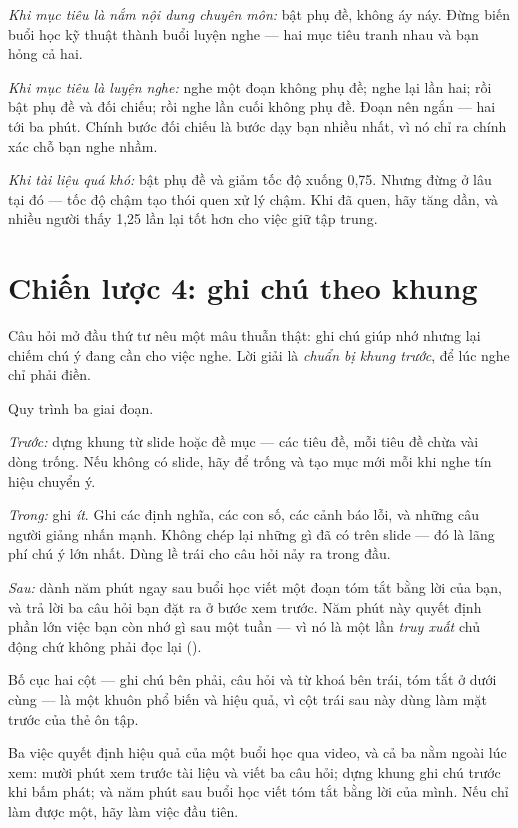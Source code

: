 \documentclass[../../english.tex]{subfiles}
\begin{document}
\emph{Khi mục tiêu là nắm nội dung chuyên môn:} bật phụ đề, không áy náy. Đừng biến buổi học kỹ thuật thành buổi luyện nghe --- hai mục tiêu tranh nhau và bạn hỏng cả hai.

\emph{Khi mục tiêu là luyện nghe:} nghe một đoạn không phụ đề; nghe lại lần hai; rồi bật phụ đề và đối chiếu; rồi nghe lần cuối không phụ đề. Đoạn nên ngắn --- hai tới ba phút. Chính bước đối chiếu là bước dạy bạn nhiều nhất, vì nó chỉ ra chính xác chỗ bạn nghe nhầm.

\emph{Khi tài liệu quá khó:} bật phụ đề và giảm tốc độ xuống 0,75. Nhưng đừng ở lâu tại đó --- tốc độ chậm tạo thói quen xử lý chậm. Khi đã quen, hãy tăng dần, và nhiều người thấy 1,25 lần lại tốt hơn cho việc giữ tập trung.

\section{Chiến lược 4: ghi chú theo khung}

Câu hỏi mở đầu thứ tư nêu một mâu thuẫn thật: ghi chú giúp nhớ nhưng lại chiếm chú ý đang cần cho việc nghe. Lời giải là \emph{chuẩn bị khung trước}, để lúc nghe chỉ phải điền.

Quy trình ba giai đoạn.

\emph{Trước:} dựng khung từ slide hoặc đề mục --- các tiêu đề, mỗi tiêu đề chừa vài dòng trống. Nếu không có slide, hãy để trống và tạo mục mới mỗi khi nghe tín hiệu chuyển ý.

\emph{Trong:} ghi \emph{ít}. Ghi các định nghĩa, các con số, các cảnh báo lỗi, và những câu người giảng nhấn mạnh. Không chép lại những gì đã có trên slide --- đó là lãng phí chú ý lớn nhất. Dùng lề trái cho câu hỏi nảy ra trong đầu.

\emph{Sau:} dành năm phút ngay sau buổi học viết một đoạn tóm tắt bằng lời của bạn, và trả lời ba câu hỏi bạn đặt ra ở bước xem trước. Năm phút này quyết định phần lớn việc bạn còn nhớ gì sau một tuần --- vì nó là một lần \emph{truy xuất} chủ động chứ không phải đọc lại ().

Bố cục hai cột --- ghi chú bên phải, câu hỏi và từ khoá bên trái, tóm tắt ở dưới cùng --- là một khuôn phổ biến và hiệu quả, vì cột trái sau này dùng làm mặt trước của thẻ ôn tập.

\begin{cannho}
Ba việc quyết định hiệu quả của một buổi học qua video, và cả ba nằm ngoài lúc xem: mười phút xem trước tài liệu và viết ba câu hỏi; dựng khung ghi chú trước khi bấm phát; và năm phút sau buổi học viết tóm tắt bằng lời của mình. Nếu chỉ làm được một, hãy làm việc đầu tiên.
\end{cannho}
\end{document}
